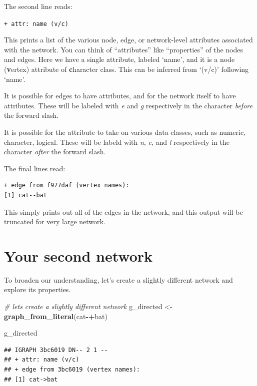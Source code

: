 \documentclass[
]{book}
\newenvironment{Shaded}{\begin{snugshade}}{\end{snugshade}}
\newcommand{\CommentTok}[1]{\textcolor[rgb]{0.56,0.35,0.01}{\textit{#1}}}
\newcommand{\FunctionTok}[1]{\textcolor[rgb]{0.13,0.29,0.53}{\textbf{#1}}}
\newcommand{\NormalTok}[1]{#1}
\newcommand{\OtherTok}[1]{\textcolor[rgb]{0.56,0.35,0.01}{#1}}
\newcommand{\SpecialCharTok}[1]{\textcolor[rgb]{0.81,0.36,0.00}{\textbf{#1}}}
\newcommand{\StringTok}[1]{\textcolor[rgb]{0.31,0.60,0.02}{#1}}
\begin{document}
The second line reads:

\texttt{+\ attr:\ name\ (v/c)}

This prints a list of the various node, edge, or network-level attributes associated with the network. You can think of ``attributes'' like ``properties'' of the nodes and edges. Here we have a single attribute, labeled `name', and it is a node (\textbf{v}ertex) attribute of \textbf{c}haracter class. This can be inferred from `(v/c)' following `name'.

It is possible for edges to have attributes, and for the network itself to have attributes. These will be labeled with \emph{e} and \emph{g} respectively in the character \emph{before} the forward slash.

It is possible for the attribute to take on various data classes, such as numeric, character, logical. These will be labeld with \emph{n}, \emph{c}, and \emph{l} respectively in the character \emph{after} the forward slash.

The final lines read:

\begin{verbatim}
+ edge from f977daf (vertex names):
[1] cat--bat
\end{verbatim}

This simply prints out all of the edges in the network, and this output will be truncated for very large network.

\section{Your second network}\label{your-second-network}

To broaden our understanding, let's create a slightly different network and explore its properties.

\begin{Shaded}
\begin{Highlighting}[]
\CommentTok{\# let\textquotesingle{}s create a slightly different network}
\NormalTok{g\_directed }\OtherTok{\textless{}{-}} \FunctionTok{graph\_from\_literal}\NormalTok{(}\StringTok{\textquotesingle{}cat\textquotesingle{}}\SpecialCharTok{{-}+}\StringTok{\textquotesingle{}bat\textquotesingle{}}\NormalTok{)}

\NormalTok{g\_directed}
\end{Highlighting}
\end{Shaded}

\begin{verbatim}
## IGRAPH 3bc6019 DN-- 2 1 -- 
## + attr: name (v/c)
## + edge from 3bc6019 (vertex names):
## [1] cat->bat
\end{verbatim}
\end{document}
